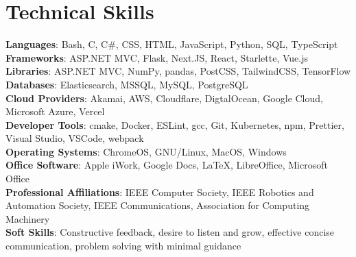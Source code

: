 \documentclass[letterpaper,11pt]{article}
\begin{document}
\section{Technical Skills}
\begin{itemize}[leftmargin=0.15in, label={}]
\small{\item{

\textbf{Languages}{: Bash, C, C\#, CSS, HTML, JavaScript, Python, SQL, TypeScript} \\

\textbf{Frameworks}{: ASP.NET MVC, Flask, Next.JS, React, Starlette, Vue.js} \\

\textbf{Libraries}{: ASP.NET MVC, NumPy, pandas, PostCSS, TailwindCSS, TensorFlow} \\

\textbf{Databases}{: Elasticsearch, MSSQL, MySQL, PostgreSQL} \\

\textbf{Cloud Providers}{: Akamai, AWS, Cloudflare, DigtalOcean, Google Cloud, Microsoft Azure, Vercel} \\

\textbf{Developer Tools}{: cmake, Docker, ESLint, gcc, Git, Kubernetes, npm, Prettier, Visual Studio, VSCode, webpack} \\

\textbf{Operating Systems}{: ChromeOS, GNU/Linux, MacOS, Windows} \\

\textbf{Office Software}{: Apple iWork, Google Docs, LaTeX, LibreOffice, Microsoft Office} \\

\textbf{Professional Affiliations}{: IEEE Computer Society, IEEE Robotics and Automation Society, IEEE Communications, Association for Computing Machinery} \\

\textbf{Soft Skills}{: Constructive feedback, desire to listen and grow, effective concise communication, problem solving with minimal guidance} \\
}}
\end{itemize}

 
\end{document}
